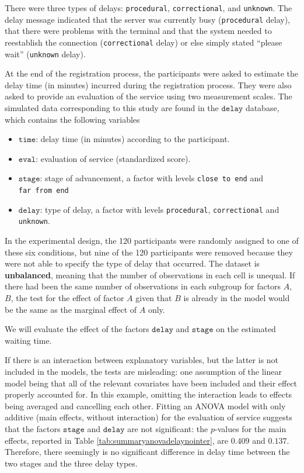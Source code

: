 \documentclass[
  11pt,
  letterpaper,
]{book}
\providecommand{\tightlist}{%
  \setlength{\itemsep}{0pt}\setlength{\parskip}{0pt}}
\theoremstyle{definition}
\theoremstyle{definition}
\theoremstyle{definition}
\theoremstyle{definition}
\theoremstyle{remark}
\begin{document}
There were three types of delays: \texttt{procedural}, \texttt{correctional}, and \texttt{unknown}. The delay message indicated that the server was currently busy (\texttt{procedural} delay), that there were problems with the terminal and that the system needed to reestablish the connection (\texttt{correctional} delay) or else simply stated ``please wait'' (\texttt{unknown} delay).

At the end of the registration process, the participants were asked to estimate the delay time (in minutes) incurred during the registration process. They were also asked to provide an evaluation of the service using two measurement scales. The simulated data corresponding to this study are found in the \(\texttt{delay}\) database, which contains the following variables

\begin{itemize}
\tightlist
\item
  \(\texttt{time}\): delay time (in minutes) according to the participant.
\item
  \(\texttt{eval}\): evaluation of service (standardized score).
\item
  \(\texttt{stage}\): stage of advancement, a factor with levels \texttt{close\ to\ end} and \texttt{far\ from\ end}
\item
  \(\texttt{delay}\): type of delay, a factor with levels \texttt{procedural}, \texttt{correctional} and \texttt{unknown}.
\end{itemize}

In the experimental design, the 120 participants were randomly assigned to one of these six conditions, but nine of the 120 participants were removed because they were not able to specify the type of delay that occurred. The dataset is \textbf{unbalanced}, meaning that the number of observations in each cell is unequal. If there had been the same number of observations in each subgroup for factors \(A\), \(B\), the test for the effect of factor \(A\) given that \(B\) is already in the model would be the same as the marginal effect of \(A\) only.

We will evaluate the effect of the factors \(\texttt{delay}\) and \(\texttt{stage}\) on the estimated waiting time.

If there is an interaction between explanatory variables, but the latter is not included in the models, the tests are misleading: one assumption of the linear model being that all of the relevant covariates have been included and their effect properly accounted for. In this example, omitting the interaction leads to effects being averaged and cancelling each other. Fitting an ANOVA model with only additive (main effects, without interaction) for the evaluation of service suggests that the factors \(\texttt{stage}\) and \(\texttt{delay}\) are not significant: the \(p\)-values for the main effects, reported in Table \ref{tab:summaryanovadelaynointer}, are \(0.409\) and \(0.137\). Therefore, there seemingly is no significant difference in delay time between the two stages and the three delay types.
\end{document}
